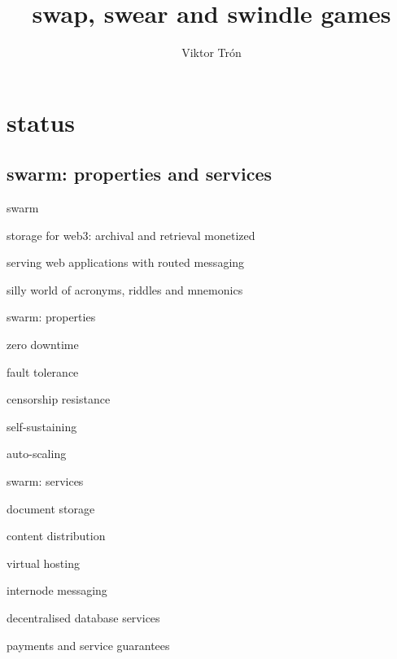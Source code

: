 \documentclass{beamer}
\title{swap, swear and swindle games}
\author{Viktor Trón}
\begin{document}
\begin{frame}
 \titlepage
\end{frame}


\section{status}


\subsection[swarm]{swarm: properties and services}


 \begin{frame}{swarm}
 \begin{block}{}
 storage for web3: archival and retrieval monetized
 \end{block}
 \begin{block}{}
 serving web applications with routed messaging
 \end{block}
 \begin{block}{}
 silly world of acronyms, riddles and mnemonics
 \end{block}
 \end{frame}


\begin{frame}{swarm:  properties}
\begin{block}{}
  zero downtime
\end{block}
\begin{block}{}
  fault tolerance
\end{block}
\begin{block}{}
  censorship resistance
\end{block}
\begin{block}{}
  self-sustaining
\end{block}
\begin{block}{}
  auto-scaling
\end{block}
\end{frame}

\begin{frame}{swarm: services}
\begin{block}{}
  document storage
\end{block}
\begin{block}{}
  content distribution
\end{block}
\begin{block}{}
  virtual hosting
\end{block}
\begin{block}{}
  internode messaging
\end{block}
\begin{block}{}
  decentralised database services
\end{block}
\begin{block}{}
  payments and service guarantees
\end{block}
\end{frame}
\end{document}
